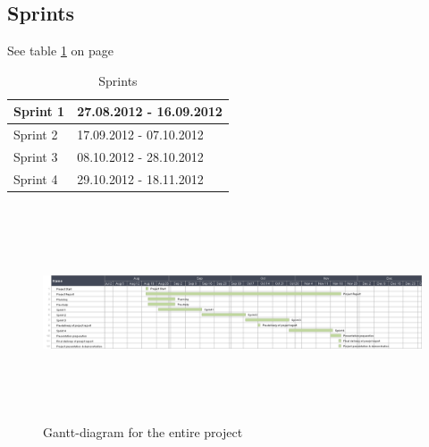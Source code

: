 \subsection*{Sprints}
See table \ref{tab:sprints} on page \pageref{tab:sprints}
\begin{table}
\begin{tabular}{l|l}
Sprint 1 &  27.08.2012 - 16.09.2012\\ \hline
Sprint 2 & 17.09.2012 - 07.10.2012\\ \hline
Sprint 3 & 08.10.2012 - 28.10.2012\\ \hline
Sprint 4 & 29.10.2012 - 18.11.2012
\end{tabular}
\caption{Sprints} \label{tab:sprints}
\end{table}

\begin{figure}[htb]
\begin{center}
\includegraphics[width=\textwidth, height=2.5in]{foo}
\caption{Gantt-diagram for the entire project}
\end{center}
\end{figure}
